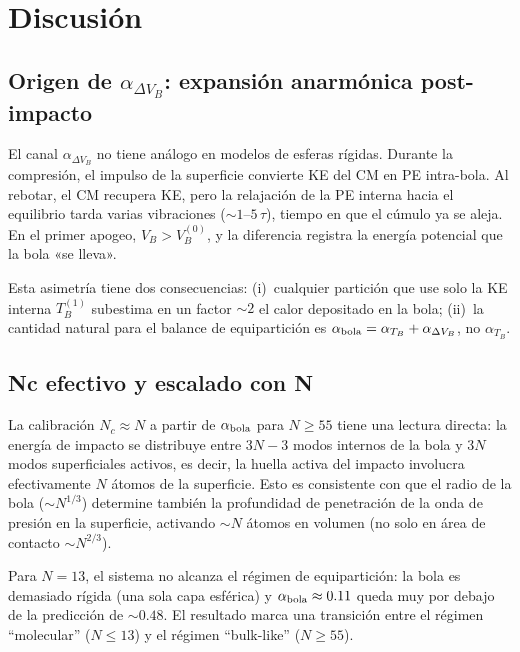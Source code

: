 \documentclass[12pt,a4paper]{article}
\begin{document}
\section{Discusión}
\label{sec:discusion}

\subsection{Origen de \texorpdfstring{$\alpha_{\Delta V_B}$}{α\_ΔVB}:
expansión anarmónica post-impacto}
\label{sec:anarmonico}

El canal $\alpha_{\Delta V_B}$ no tiene análogo en modelos de esferas rígidas.
Durante la compresión, el impulso de la superficie convierte KE del CM en PE
intra-bola. Al rebotar, el CM recupera KE, pero la relajación de la PE interna
hacia el equilibrio tarda varias vibraciones ($\sim1$--$5\,\tau$), tiempo en que
el cúmulo ya se aleja. En el primer apogeo, $V_B>V_B^{(0)}$, y la diferencia
registra la energía potencial que la bola «se lleva».

Esta asimetría tiene dos consecuencias: (i)~cualquier partición que use solo
la KE interna $T_B^{(1)}$ subestima en un factor $\sim2$ el calor depositado
en la bola; (ii)~la cantidad natural para el balance de equipartición es
$\alpha_{\rm bola}=\alpha_{T_B}+\alpha_{\Delta V_B}$, no $\alpha_{T_B}$.

\subsection{Nc efectivo y escalado con N}
\label{sec:Nc_interpretacion}

La calibración $N_c\approx N$ a partir de $\alpha_{\rm bola}$ para $N\geq55$
tiene una lectura directa: la energía de impacto se distribuye entre $3N-3$
modos internos de la bola y $3N$ modos superficiales activos, es decir, la
huella activa del impacto involucra efectivamente $N$ átomos de la superficie.
Esto es consistente con que el radio de la bola ($\sim N^{1/3}$) determine
también la profundidad de penetración de la onda de presión en la superficie,
activando $\sim N$ átomos en volumen (no solo en área de contacto $\sim N^{2/3}$).

Para $N=13$, el sistema no alcanza el régimen de equipartición: la bola es
demasiado rígida (una sola capa esférica) y $\alpha_{\rm bola}\approx0.11$
queda muy por debajo de la predicción de $\sim0.48$. El resultado marca una
transición entre el régimen ``molecular'' ($N\leq13$) y el régimen ``bulk-like''
($N\geq55$).
\end{document}
